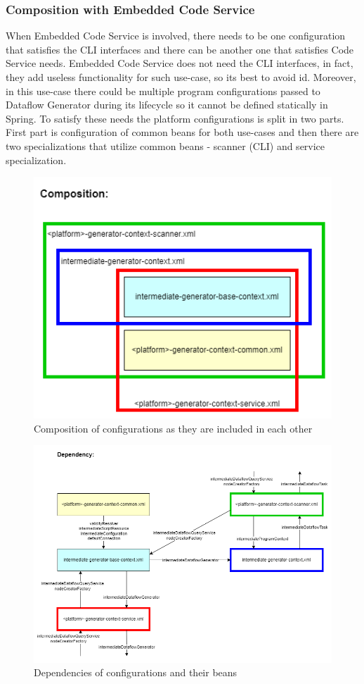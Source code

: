 \subsubsection{Composition with Embedded Code Service}
When Embedded Code Service is involved, there needs to be one configuration that satisfies the CLI interfaces and there can be another one that satisfies Code Service needs. Embedded Code Service does not need the CLI interfaces, in fact, they add useless functionality for such use-case, so its best to avoid id. Moreover, in this use-case there could be multiple program configurations passed to Dataflow Generator during its lifecycle so it cannot be defined statically in Spring. To satisfy these needs the platform configurations is split in two parts. First part is configuration of common beans for both use-cases and then there are two specializations that utilize common beans - scanner (CLI) and service specialization.
\begin{figure}[ht]\centering
\includegraphics[width=1.0\textwidth]{img/Intermediate Dataflow Generator Configuration-code service-aware composition.png}
\caption{Composition of configurations as they are included in each other}
\label{fig01:ECSbasedesign05}
\end{figure}  
\begin{figure}[ht]\centering
\includegraphics[width=1.0\textwidth]{img/Intermediate Dataflow Generator Configuration-code service-aware dependency.png}
\caption{Dependencies of configurations and their beans}
\label{fig01:ECSbasedesign06}
\end{figure}  


